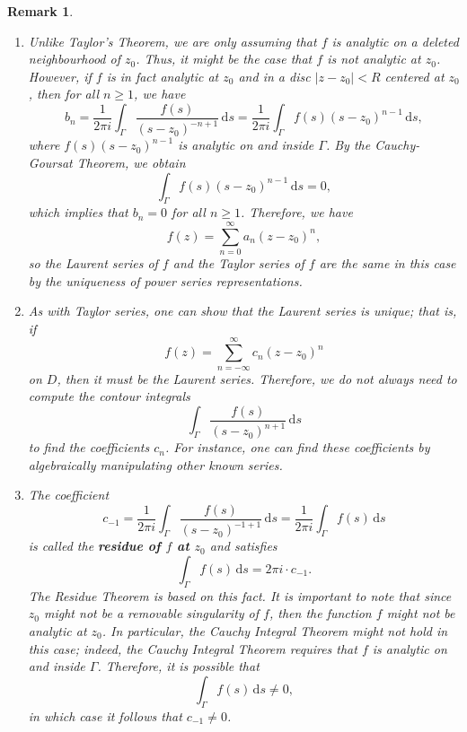 \documentclass[10pt]{article}
\newcommand{\dd}{\,\mathrm{d}}
\theoremstyle{newstyle}
\newtheorem{remark}[thm]{Remark}
\begin{document}
\begin{remark}~
\begin{enumerate}[(1)]
    \item Unlike Taylor's Theorem, we are only assuming that $f$ is analytic on a deleted 
    neighbourhood of $z_0$. Thus, it might be the case that $f$ is not analytic at $z_0$. 
    However, if $f$ is in fact analytic at $z_0$ and in a disc $|z-z_0| < R$ centered at $z_0$, then 
    for all $n \geq 1$, we have 
    \[ b_n = \frac{1}{2\pi i} \int_\Gamma \frac{f(s)}{(s-z_0)^{-n+1}}\dd s = 
    \frac{1}{2\pi i} \int_\Gamma f(s)(s-z_0)^{n-1} \dd s, \]
    where $f(s)(s-z_0)^{n-1}$ is analytic on and inside $\Gamma$. By the Cauchy-Goursat Theorem, 
    we obtain 
    \[ \int_\Gamma f(s)(s-z_0)^{n-1}\dd s = 0, \]
    which implies that $b_n = 0$ for all $n \geq 1$. Therefore, we have 
    \[ f(z) = \sum_{n=0}^\infty a_n(z-z_0)^n, \]
    so the Laurent series of $f$ and the Taylor series of $f$ are the same 
    in this case by the uniqueness of 
    power series representations. 
    
    \item As with Taylor series, one can show that the Laurent series is unique; that is, if 
    \[ f(z) = \sum_{n=-\infty}^\infty c_n(z-z_0)^n \] 
    on $D$, then it must be the Laurent series. Therefore, we do not always need to compute the 
    contour integrals 
    \[ \int_\Gamma \frac{f(s)}{(s-z_0)^{n+1}}\dd s \]
    to find the coefficients $c_n$. For instance, one can find these coefficients by 
    algebraically manipulating other known series. 
    
    \item The coefficient 
    \[ c_{-1} = \frac{1}{2\pi i} \int_\Gamma \frac{f(s)}{(s-z_0)^{-1+1}}\dd s = \frac{1}{2\pi i} 
    \int_\Gamma f(s)\dd s \] 
    is called the {\bf residue of $f$ at $z_0$} and satisfies 
    \[ \int_\Gamma f(s)\dd s = 2\pi i \cdot c_{-1}. \]
    The Residue Theorem is based on this fact. It is important to note that since $z_0$ might 
    not be a removable singularity of $f$, then the function $f$ might not be analytic at $z_0$. 
    In particular, the Cauchy Integral Theorem might not hold in this case; indeed, the Cauchy 
    Integral Theorem requires that $f$ is analytic on and inside $\Gamma$. Therefore, it is 
    possible that 
    \[ \int_\Gamma f(s)\dd s \neq 0, \]
    in which case it follows that $c_{-1} \neq 0$. 
\end{enumerate}
\end{remark}
\end{document}
